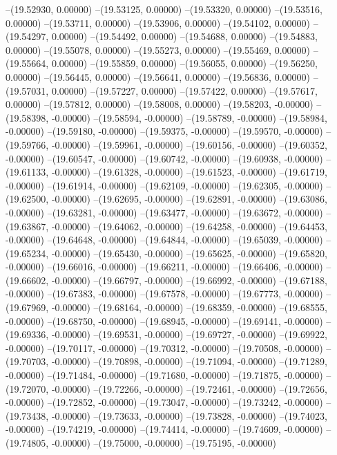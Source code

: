--(19.52930, 0.00000)
--(19.53125, 0.00000)
--(19.53320, 0.00000)
--(19.53516, 0.00000)
--(19.53711, 0.00000)
--(19.53906, 0.00000)
--(19.54102, 0.00000)
--(19.54297, 0.00000)
--(19.54492, 0.00000)
--(19.54688, 0.00000)
--(19.54883, 0.00000)
--(19.55078, 0.00000)
--(19.55273, 0.00000)
--(19.55469, 0.00000)
--(19.55664, 0.00000)
--(19.55859, 0.00000)
--(19.56055, 0.00000)
--(19.56250, 0.00000)
--(19.56445, 0.00000)
--(19.56641, 0.00000)
--(19.56836, 0.00000)
--(19.57031, 0.00000)
--(19.57227, 0.00000)
--(19.57422, 0.00000)
--(19.57617, 0.00000)
--(19.57812, 0.00000)
--(19.58008, 0.00000)
--(19.58203, -0.00000)
--(19.58398, -0.00000)
--(19.58594, -0.00000)
--(19.58789, -0.00000)
--(19.58984, -0.00000)
--(19.59180, -0.00000)
--(19.59375, -0.00000)
--(19.59570, -0.00000)
--(19.59766, -0.00000)
--(19.59961, -0.00000)
--(19.60156, -0.00000)
--(19.60352, -0.00000)
--(19.60547, -0.00000)
--(19.60742, -0.00000)
--(19.60938, -0.00000)
--(19.61133, -0.00000)
--(19.61328, -0.00000)
--(19.61523, -0.00000)
--(19.61719, -0.00000)
--(19.61914, -0.00000)
--(19.62109, -0.00000)
--(19.62305, -0.00000)
--(19.62500, -0.00000)
--(19.62695, -0.00000)
--(19.62891, -0.00000)
--(19.63086, -0.00000)
--(19.63281, -0.00000)
--(19.63477, -0.00000)
--(19.63672, -0.00000)
--(19.63867, -0.00000)
--(19.64062, -0.00000)
--(19.64258, -0.00000)
--(19.64453, -0.00000)
--(19.64648, -0.00000)
--(19.64844, -0.00000)
--(19.65039, -0.00000)
--(19.65234, -0.00000)
--(19.65430, -0.00000)
--(19.65625, -0.00000)
--(19.65820, -0.00000)
--(19.66016, -0.00000)
--(19.66211, -0.00000)
--(19.66406, -0.00000)
--(19.66602, -0.00000)
--(19.66797, -0.00000)
--(19.66992, -0.00000)
--(19.67188, -0.00000)
--(19.67383, -0.00000)
--(19.67578, -0.00000)
--(19.67773, -0.00000)
--(19.67969, -0.00000)
--(19.68164, -0.00000)
--(19.68359, -0.00000)
--(19.68555, -0.00000)
--(19.68750, -0.00000)
--(19.68945, -0.00000)
--(19.69141, -0.00000)
--(19.69336, -0.00000)
--(19.69531, -0.00000)
--(19.69727, -0.00000)
--(19.69922, -0.00000)
--(19.70117, -0.00000)
--(19.70312, -0.00000)
--(19.70508, -0.00000)
--(19.70703, -0.00000)
--(19.70898, -0.00000)
--(19.71094, -0.00000)
--(19.71289, -0.00000)
--(19.71484, -0.00000)
--(19.71680, -0.00000)
--(19.71875, -0.00000)
--(19.72070, -0.00000)
--(19.72266, -0.00000)
--(19.72461, -0.00000)
--(19.72656, -0.00000)
--(19.72852, -0.00000)
--(19.73047, -0.00000)
--(19.73242, -0.00000)
--(19.73438, -0.00000)
--(19.73633, -0.00000)
--(19.73828, -0.00000)
--(19.74023, -0.00000)
--(19.74219, -0.00000)
--(19.74414, -0.00000)
--(19.74609, -0.00000)
--(19.74805, -0.00000)
--(19.75000, -0.00000)
--(19.75195, -0.00000)
